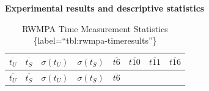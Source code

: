 \textbf{Experimental results and descriptive statistics}

\begin{longtable}[]{@{}llllllll@{}}
\caption{RWMPA Time Measurement Statistics \{label=``tbl:rwmpa-timeresults''\}}\tabularnewline
\toprule
\begin{minipage}[b]{0.10\columnwidth}\raggedright
\(\overline{t_U}\)\strut
\end{minipage} & \begin{minipage}[b]{0.10\columnwidth}\raggedright
\(\overline{t_S}\)\strut
\end{minipage} & \begin{minipage}[b]{0.08\columnwidth}\raggedright
\(\sigma(t_U)\)\strut
\end{minipage} & \begin{minipage}[b]{0.08\columnwidth}\raggedright
\(\sigma(t_S)\)\strut
\end{minipage} & \begin{minipage}[b]{0.10\columnwidth}\raggedright
\(\overline{t6}\)\strut
\end{minipage} & \begin{minipage}[b]{0.10\columnwidth}\raggedright
\(\overline{t10}\)\strut
\end{minipage} & \begin{minipage}[b]{0.10\columnwidth}\raggedright
\(\overline{t11}\)\strut
\end{minipage} & \begin{minipage}[b]{0.10\columnwidth}\raggedright
\(\overline{t16}\)\strut
\end{minipage}\tabularnewline
\midrule
\endfirsthead
\toprule
\begin{minipage}[b]{0.10\columnwidth}\raggedright
\(\overline{t_U}\)\strut
\end{minipage} & \begin{minipage}[b]{0.10\columnwidth}\raggedright
\(\overline{t_S}\)\strut
\end{minipage} & \begin{minipage}[b]{0.08\columnwidth}\raggedright
\(\sigma(t_U)\)\strut
\end{minipage} & \begin{minipage}[b]{0.08\columnwidth}\raggedright
\(\sigma(t_S)\)\strut
\end{minipage} & \begin{minipage}[b]{0.10\columnwidth}\raggedright
\(\overline{t6}\)\strut
\end{minipage} & \begin{minipage}[b]{0.10\columnwidth}\raggedright

\end{minipage}
\end{longtable}
